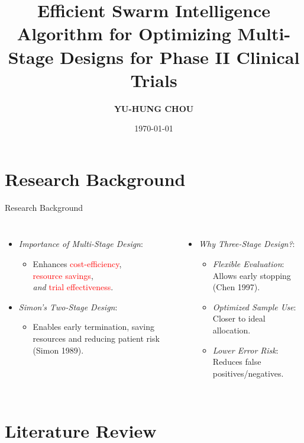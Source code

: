 \documentclass[xcolor=red]{beamer}
\title{Efficient Swarm Intelligence Algorithm for Optimizing Multi-Stage Designs for Phase II Clinical Trials}
\author{\textbf{YU-HUNG CHOU}}
\institute[National Taipei University] %
{
  National Taipei University \\ %
  \vspace{0.5cm}
  Advisor: Professor [Ping Yang Chen]  %
}
\date{{\R \today}}
\begin{document}
\maketitle


\section{Research Background}

\begin{frame}{Research Background}
\begin{columns}

\begin{itemize}
    \item \textit{Importance of Multi-Stage Design}:
    \begin{itemize}
        \setlength{\itemsep}{0pt}
        \item Enhances \textcolor{red}{cost-efficiency},\\ \textcolor{red}{resource savings},\\ \textit{and} \textcolor{red}{trial effectiveness}.
    \end{itemize}
    \item \textit{Simon's Two-Stage Design}:
    \begin{itemize}
        \setlength{\itemsep}{0pt}
        \item Enables early termination, saving resources and reducing patient risk (Simon 1989).
    \end{itemize}
\end{itemize}

\begin{itemize}
    \item \textit{Why Three-Stage Design?}:
    \begin{itemize}
        \setlength{\itemsep}{0pt}
        \item \textit{Flexible Evaluation}: Allows early stopping (Chen 1997).
        \item \textit{Optimized Sample Use}: Closer to ideal allocation.
        \item \textit{Lower Error Risk}: Reduces false positives/negatives.
    \end{itemize}
\end{itemize}

\end{columns}
\end{frame}

\section{Literature Review}
\end{document}
